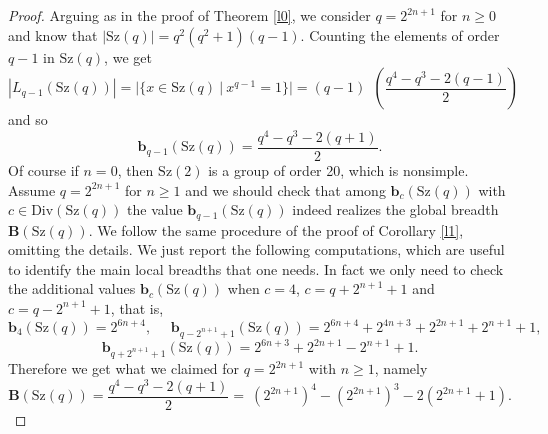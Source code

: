 \documentclass[10pt,a4paper]{amsart}
\begin{document}
\begin{proof} Arguing as in the proof of Theorem \ref{l0}, we consider $q=2^{2n+1}$ for $n \ge 0$ and know that $|\mathrm{Sz}(q)|= q^2(q^2+1)(q-1)$. Counting the elements of order $q-1$ in $\mathrm{Sz}(q)$, we get
\begin{equation}
|L_{q-1}(\mathrm{Sz}(q))|=|\{x \in \mathrm{Sz}(q) \ | \ x^{q-1}=1\}|=(q-1) \ \ \left(\frac{q^4-q^3-2(q-1)}{2}\right)
\end{equation}
and so \begin{equation}\mathbf{b}_{q-1}(\mathrm{Sz}(q))=\frac{q^4-q^3-2(q+1)}{2}.
\end{equation}
Of course if $n=0$, then $\mathrm{Sz}(2)$ is a group of order 20, which is nonsimple. Assume $q=2^{2n+1}$ for $n \ge 1$ and we should check that among $\mathbf{b}_c(\mathrm{Sz}(q))$ with $c\in \mathrm{Div}(\mathrm{Sz}(q))$ the value $\mathbf{b}_{q-1}(\mathrm{Sz}(q))$ indeed realizes the global breadth $\mathbf{B}(\mathrm{Sz}(q))$. We follow the same procedure of the proof of Corollary \ref{l1}, omitting the details. We just report the following computations, which are useful to identify the main local breadths that one needs. In fact we  only need to check the additional values $\mathbf{b}_{c}(\mathrm{Sz}(q))$ when $c=4$, $c=q+2^{n+1} + 1$ and $c=q-2^{n+1} + 1$, that is, 
\begin{equation}
    \mathbf{b}_4(\mathrm{Sz}(q))=  2^{6n+4}, \ \ \ \ \ \ 
    \mathbf{b}_{q-2^{n+1}+1}(\mathrm{Sz}(q))=  2^{6n+4}+2^{4n+3}+2^{2n+1}+2^{n+1}+1,
\end{equation}  
\begin{equation}
\mathbf{b}_{q+2^{n+1} + 1}(\mathrm{Sz}(q))= 2^{6n+3}+2^{2n+1}-2^{n+1}+1.
\end{equation}
Therefore we get what we claimed for $q=2^{2n+1}$  with $n \geq 1$, namely \begin{equation}\mathbf{B}(\mathrm{Sz}(q)) = \frac{q^4-q^3-2(q+1)}{2}=\:\left(2^{2n+1}\right)^4-\left(2^{2n+1}\right)^3-2\left(2^{2n+1}+1\right).\end{equation} 
\end{proof}
\end{document}
